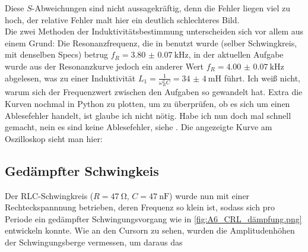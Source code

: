 Diese \(S\)-Abweichungen sind nicht aussagekräftig, denn die Fehler liegen viel zu hoch, der relative Fehler malt hier ein deutlich schlechteres Bild.\\
Die zwei Methoden der Induktivitätsbestimmung unterscheiden sich vor allem aus einem Grund: Die Resonanzfrequenz, die in  benutzt wurde (selber Schwingkreis, mit denselben Specs) betrug \(f_R=\qty{3.80(7)}{\kilo\hertz}\), in der aktuellen Aufgabe wurde aus der Resonanzkurve jedoch ein anderer Wert \(f_R=\qty{4.00(7)}{\kilo\hertz}\) abgelesen, was zu einer Induktivität \(L_1=\frac{1}{\omega_R^2C}=\qty{34(4)}{\milli\henry}\) führt. 
Ich weiß nicht, warum sich der Frequenzwert zwischen den Aufgaben so gewandelt hat. Extra die Kurven nochmal in Python zu plotten, um zu überprüfen, ob es sich um einen Ablesefehler handelt, ist glaube ich nicht nötig. Habe ich nun doch mal schnell gemacht, nein es sind keine Ablesefehler, siehe . Die angezeigte Kurve am Oszilloskop sieht man hier:
\newpage
{}

\subsection{Gedämpfter Schwingkeis}
\FloatBarrier
Der RLC-Schwingkreis (\(R=\qty{47}{\ohm}\), \(C=\qty{47}{\nano\farad}\)) wurde nun mit einer Rechteckspannnung betrieben, deren Frequenz so klein ist, sodass sich pro Periode ein gedämpfter Schwingungsvorgang wie in \cref{fig:A6_CRL_dämpfung.png} entwickeln konnte. Wie an den Cursorn zu sehen, wurden die Amplitudenhöhen der Schwingungsberge vermessen, um daraus das 
